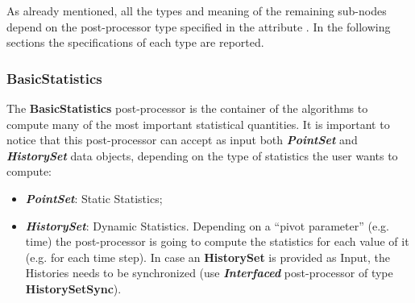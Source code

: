 As already mentioned, all the types and meaning of the remaining sub-nodes
depend on the post-processor type specified in the attribute .
%
In the following sections the specifications of each type are reported.

\subsubsection{BasicStatistics}
\label{BasicStatistics}
The \textbf{BasicStatistics} post-processor is the container of the algorithms
to compute many of the most important statistical quantities. It is important to notice that this
post-processor can accept as input both \textit{\textbf{PointSet}} and \textit{\textbf{HistorySet}}
data objects, depending on the type of statistics the user wants to compute:
\begin{itemize}
  \item \textit{\textbf{PointSet}}: Static Statistics;
  \item \textit{\textbf{HistorySet}}: Dynamic Statistics. Depending on a ``pivot parameter'' (e.g. time)
  the post-processor is going to compute the statistics for each value of it (e.g. for each time step).
  In case an \textbf{HistorySet} is provided as Input, the Histories needs to be synchronized (use
    \textit{\textbf{Interfaced}} post-processor of type  \textbf{HistorySetSync}).
\end{itemize}
%
